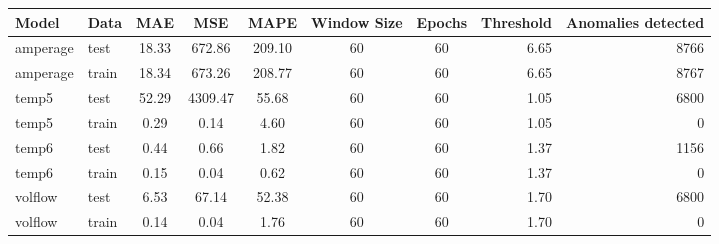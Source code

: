 \begin{tabular}{llcccccrr}
\hline
Model & Data & MAE & MSE & MAPE & Window Size & Epochs & Threshold & Anomalies detected \\
\hline
amperage & test & 18.33 & 672.86 & 209.10 & 60 & 60 & 6.65 & 8766 \\
amperage & train & 18.34 & 673.26 & 208.77 & 60 & 60 & 6.65 & 8767 \\
temp5 & test & 52.29 & 4309.47 & 55.68 & 60 & 60 & 1.05 & 6800 \\
temp5 & train & 0.29 & 0.14 & 4.60 & 60 & 60 & 1.05 & 0 \\
temp6 & test & 0.44 & 0.66 & 1.82 & 60 & 60 & 1.37 & 1156 \\
temp6 & train & 0.15 & 0.04 & 0.62 & 60 & 60 & 1.37 & 0 \\
volflow & test & 6.53 & 67.14 & 52.38 & 60 & 60 & 1.70 & 6800 \\
volflow & train & 0.14 & 0.04 & 1.76 & 60 & 60 & 1.70 & 0 \\
\hline
\end{tabular}
